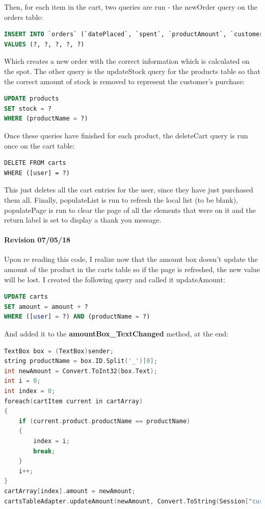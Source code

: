 ﻿\documentclass{article}
\begin{document}
\begin{itemize}
        Then, for each item in the cart, two queries are run - the newOrder query on the orders table:
        \begin{lstlisting}[language=SQL]
INSERT INTO `orders` (`datePlaced`, `spent`, `productAmount`, `customer`, `product`)
VALUES (?, ?, ?, ?, ?)
        \end{lstlisting}
        Which creates a new order with the correct information which is calculated on the spot.
        The other query is the updateStock query for the products table so that the correct amount of stock is removed to represent the customer's purchase:
        \begin{lstlisting}[language=SQL]
UPDATE products
SET stock = ?
WHERE (productName = ?)
        \end{lstlisting}
        Once these queries have finished for each product, the deleteCart query is run once on the cart table:
        \begin{lstlisting}
DELETE FROM carts
WHERE ([user] = ?)
        \end{lstlisting}
        This just deletes all the cart entries for the user, since they have just purchased them all.
        Finally, populateList is run to refresh the local list (to be blank), populatePage is run to clear the page of all the elements that were on it and the return label is set to display a thank you message.
    \end{itemize}
    \paragraph{Revision 07/05/18}
    Upon re reading this code, I realize now that the amount box doesn't update the amount of the product in the carts table so if the page is refreshed, the new value will be lost.
    I created the following query and called it updateAmount:
    \begin{lstlisting}[language=SQL]
UPDATE carts
SET amount = amount + ?
WHERE ([user] = ?) AND (productName = ?)
    \end{lstlisting}
    And added it to the \textbf{amountBox\_TextChanged} method, at the end:
    \begin{lstlisting}[language=C]
TextBox box = (TextBox)sender;
string productName = box.ID.Split('_')[0];
int newAmount = Convert.ToInt32(box.Text);
int i = 0;
int index = 0;
foreach(cartItem current in cartArray)
{
    if (current.product.productName == productName)
    {
        index = i;
        break;
    }
    i++;
}
cartArray[index].amount = newAmount;
cartsTableAdapter.updateAmount(newAmount, Convert.ToString(Session["currentUser"]), productName);
    \end{lstlisting}
    \newpage
\end{document}
